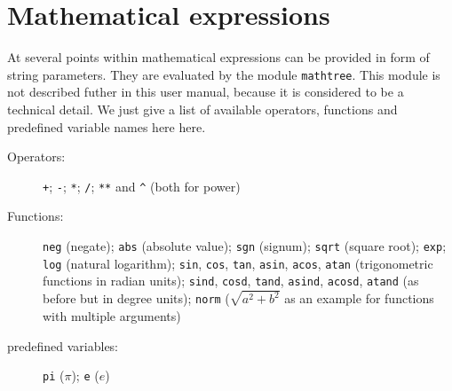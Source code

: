 \chapter{Mathematical expressions}
\label{mathtree}

At several points within \PyX{} mathematical expressions can be
provided in form of string parameters. They are evaluated by the
module \verb|mathtree|. This module is not described futher in this
user manual, because it is considered to be a technical detail. We
just give a list of available operators, functions and predefined
variable names here here.

\begin{description}
\item[Operators:]
\verb|+|; \verb|-|; \verb|*|; \verb|/|; \verb|**| and \verb|^| (both
for power)
\item[Functions:]
\verb|neg| (negate); \verb|abs| (absolute value); \verb|sgn| (signum);
\verb|sqrt| (square root); \verb|exp|; \verb|log| (natural logarithm);
\verb|sin|, \verb|cos|, \verb|tan|, \verb|asin|, \verb|acos|,
\verb|atan| (trigonometric functions in radian units); \verb|sind|,
\verb|cosd|, \verb|tand|, \verb|asind|, \verb|acosd|, \verb|atand| (as
before but in degree units); \verb|norm| ($\sqrt{a^2+b^2}$ as an
example for functions with multiple arguments)
\item[predefined variables:]
\verb|pi| ($\pi$); \verb|e| ($e$)
\end{description}
